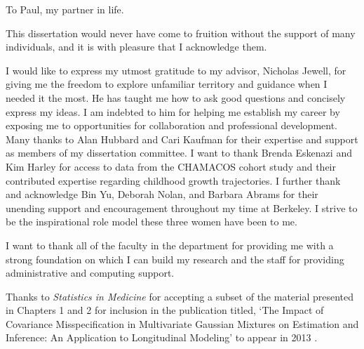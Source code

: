 \documentclass{ucbthesis}
\begin{document}
\begin{frontmatter}

\begin{dedication}
\null\vfil
\begin{center}
To Paul, my partner in life.\\\vspace{12pt}

\end{center}
\vfil\null
\end{dedication}

\begin{KeepFromToc}
  \tableofcontents
\end{KeepFromToc}

\clearpage
\listoffigures
\clearpage
\listoftables

\begin{acknowledgements}
This dissertation would never have come to fruition without the support of many individuals, and it is with pleasure that I acknowledge them.

I would like to express my utmost gratitude to my advisor, Nicholas Jewell, for giving me the freedom to explore unfamiliar territory and guidance when I needed it the most. He has taught me how to ask good questions and concisely express my ideas. I am indebted to him for helping me establish my career by exposing me to opportunities for collaboration and professional development. Many thanks to Alan Hubbard and Cari Kaufman for their expertise and support as members of my dissertation committee. I want to thank Brenda Eskenazi and Kim Harley for access to data from the CHAMACOS cohort study and their contributed expertise regarding childhood growth trajectories. I further thank and acknowledge Bin Yu, Deborah Nolan, and Barbara Abrams for their unending support and encouragement throughout my time at Berkeley. I strive to be the inspirational role model these three women have been to me.

I want to thank all of the faculty in the department for providing me with a strong foundation on which I can build my research and the staff for providing administrative and computing support. 

Thanks to \emph{Statistics in Medicine} for accepting a subset of the material presented in Chapters 1 and 2 for inclusion in the publication titled, `The Impact of Covariance Misspecification in Multivariate Gaussian Mixtures on Estimation and Inference: An Application to Longitudinal Modeling' to appear in 2013 \cite{heggeseth2013}. 


\end{acknowledgements}
\end{frontmatter}
\end{document}
